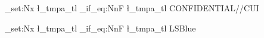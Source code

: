 \documentclass[letterpaper]{article}
\begin{document}
\ExplSyntaxOn
\tl_set:Nx \l_tmpa_tl {\LSBannerText}
\tl_if_eq:NnF \l_tmpa_tl {CONFIDENTIAL//CUI}
  {\PackageError{linearspace-test}{CONFIDENTIAL+CUI~banner~regression}{}}
\tl_set:Nx \l_tmpa_tl {\LSBannerColor}
\tl_if_eq:NnF \l_tmpa_tl {LSBlue}
  {\PackageError{linearspace-test}{CONFIDENTIAL~banner-color~regression}{}}
\ExplSyntaxOff
\LSMarkingNotices
{}
\end{document}
